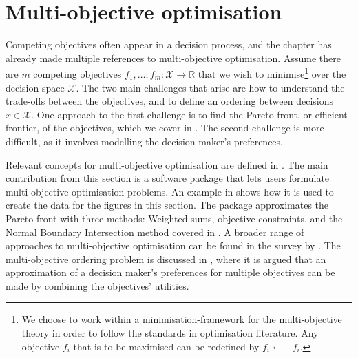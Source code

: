 \documentclass[main.tex]{subfiles}
\begin{document}
\section{Multi-objective optimisation}\label{sec:one_multi-objective}
Competing objectives often appear in a decision process, and the chapter
has already made multiple references to multi-objective optimisation.  Assume
there are $m$ competing objectives
$f_1,\dots,f_m:\mathcal{X}\to\mathbb{R}$ that we wish to
minimise\footnote{We choose to work within a minimisation-framework
  for the multi-objective theory in order to follow the standards in
  optimisation literature. Any objective $f_i$ that is to be maximised
  can be redefined by $f_i\leftarrow -f_i$.} over the decision space
$\mathcal{X}$. The two main challenges that arise are how to understand
the trade-offs between the objectives, and to define an ordering
between decisions $x\in\mathcal{X}$.  One approach to the first
challenge is to find the Pareto front, or efficient
frontier, of the objectives, which we cover in
. The second challenge is more difficult,
as it involves modelling the decision maker's preferences.

Relevant concepts for multi-objective optimisation are defined in
.  The main contribution from this section
is a software package that lets users formulate
multi-objective optimisation problems.  An example in
 shows how it is used to create the data for
the figures in this section.  The package approximates the Pareto
front with
three methods: Weighted sums, objective
constraints, and the Normal Boundary Intersection method covered in
.  A broader range of
approaches to multi-objective optimisation can be found in the survey
by \citet{marler2004survey}.  The multi-objective ordering problem is
discussed in , where it is argued that an
approximation of a decision maker's preferences for multiple
objectives can be made by combining the objectives' utilities.
\end{document}

